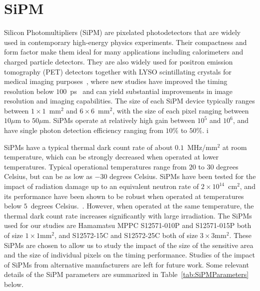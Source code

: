 \section{SiPM}
\label{sec:sipm}

Silicon Photomultipliers (SiPM) are pixelated photodetectors that are widely
used in contemporary high-energy physics experiments. Their compactness and form
factor make them ideal for many applications including calorimeters and charged
particle detectors. They are also widely used for positron emission tomography
(PET) detectors together with LYSO scintillating crystals for medical imaging
purposes~\cite{Vandenberghe2016}, where new studies have improved the 
timing resolution below $100$~ps~\cite{LecoqTOFPET} and 
 can yield substantial improvements in image resolution and imaging 
 capabilities. The size of each SiPM device typically
ranges between $1\times 1$~$\mathrm{mm}^{2}$ and $6\times 6$~$\mathrm{mm}^{2}$,
with the size of each pixel ranging between $10\mu$m to $50\mu$m. SiPMs operate
at relatively high gain between $10^{5}$ and $10^{6}$, and have single photon detection
efficiency ranging from $10\%$ to $50\%$. 
i%


SiPMs have a typical thermal dark count rate of about
$0.1$~MHz/$\mathrm{mm}^{2}$ at room temperature, which can be strongly decreased
when operated at lower temperatures. Typical operational temperatures range from
$20$ to $30$ degrees Celsius, but can be as low as $-30$ degrees Celsius. SiPMs
have been tested for the impact of radiation damage up to an equivalent neutron
rate of $2\times10^{14}$~$\mathrm{cm}^{2}$, and its performance have been shown
to be robust when operated at temperatures below $5$~degrees
Celsius.~\cite{SiPMIrradiated1,SiPMIrradiated2}. However, when operated at the
same temperature, the thermal dark count rate increases significantly with large
irradiation. The SiPMs used for our studies are Hamamatsu 
MPPC S12571-010P and S12571-015P both of 
size $1\times1\mathrm{mm}^{2}$, and S12572-15C and S12572-25C both of size 
$3\times3\mathrm{mm}^{2}$. These SiPMs are chosen to allow us to study
the impact of the size of the sensitive area and the size of individual pixels 
on the timing performance. Studies of the impact of SiPMs from alternative 
manufacturers are left for future work. Some relevant details of the SiPM parameters
are summarized in Table~\ref{tab:SiPMParameters} below.

